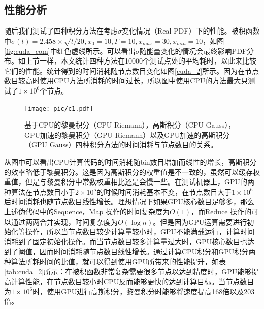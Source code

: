 \subsection{性能分析}

随后我们测试了四种积分方法在考虑$\sigma$变化情况（Real PDF）下的性能。被积函数中$\sigma(t)=2.458\times\sqrt{t/20}, x_0=10, \Gamma=10,x_{max}=30,x_{min}=10$，如图\ref{fig:cuda_com}中红色虚线所示。可以看出$\sigma$随能量变化的情况会最终影响PDF分布。如上节一样，本文统计四种方法在10000个测试点处的平均耗时，以此来比较它们的性能。统计得到的时间消耗随节点数目变化如图\ref{cuda_2}所示。因为在节点数目较高时使用CPU方法所消耗的时间过长，所以图中使用CPU的方法最大只测试了$1\times10^6$个节点。

\begin{figure}
    \centering
    \texttt{[image: pic/c1.pdf]}
    \caption{ 基于CPU的黎曼积分（CPU Riemann），高斯积分（CPU Gauss），GPU加速的黎曼积分（GPU Riemann）以及GPU加速的高斯积分（GPU Gauss）四种积分方法的时间消耗与节点数目的关系。}
    \label{fig:cuda_2}
\end{figure}

从图中可以看出CPU计算代码的时间消耗随bin数目增加而线性的增长，高斯积分的效率略低于黎曼积分。这是因为高斯积分的权重值是不一致的，虽然可以缓存权重值，但是与黎曼积分中常数权重相比还是会慢一些。在测试机器上，GPU的两种算法在节点数目小于$2\times10^5$的时候时间消耗基本不变，在节点数目大于$1\times10^6$后时间消耗也随节点数目线性增长。理想情况下如果GPU核心数目足够多，那么上述伪代码中的Sequence，Map 操作的时间复杂度为$O(1)$，而Reduce 操作的可以通过两两合并实现，时间复杂度为$O(\log{n})$。但是因为GPU运算需要进行初始化等操作，所以当节点数目较少计算量较小时，GPU不能满载运行，计算时间消耗到了固定初始化操作。而当节点数目较多计算量过大时，GPU核心数目也达到了阈值，因而时间消耗随节点数目线性增长。通过计算CPU积分和GPU积分两种算法所耗时间的比值，就可以得到使用GPU所带来的性能提升，如表\ref{tab:cuda_2}所示：在被积函数非常复杂需要很多节点以达到精度时，GPU能够提高计算性能，在节点数目较小时CPU反而能够更快的达到计算目标。当节点数目为$1\times10^6$时，使用GPU进行高斯积分，黎曼积分时能够将速度提高168倍以及203倍。

